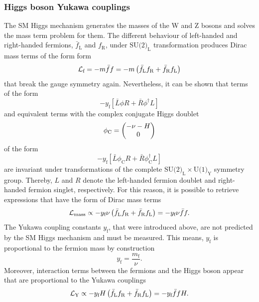 \subsubsection{Higgs boson Yukawa couplings}
The SM Higgs mechanism generates the masses of the W and Z bosons and solves the mass term problem for them. The 
different behaviour of left-handed and right-handed fermions, $\bar{f}_\text{L}$ and $f_\text{R}$,  under $\text{SU(2)}_\text{L}$ transformation produces Dirac mass terms of the form 
form
\begin{equation}
    \mathcal{L}_\text{f} = -m\bar{f}f  = -m \left( \bar{f}_\text{L}f_\text{R} + \bar{f}_\text{R}f_\text{L}\right)
\end{equation} 
that break the gauge symmetry again.
Nevertheless, it can be shown that terms of the form 
\begin{equation}
    -y_\text{f} \left[ \bar{L}\phi R + \bar{R}\phi^\dagger L \right]
\end{equation}
and equivalent terms with the complex conjugate Higgs doublet
\begin{equation}
     \phi_\text{C} = \begin{pmatrix} -\nu-H \\ 0 \end{pmatrix}
\end{equation}
of the form
\begin{equation}
    -y_\text{f} \left[ \bar{L}\phi_\text{C} R + \bar{R}\phi_\text{C}^\dagger L \right]
\end{equation}
 are invariant under transformations of the complete $\text{SU(2)}_\text{L} \times \text{U(1)}_\text{Y}$ symmetry group. 
Thereby, $L$ and $R$ denote the left-handed fermion doublet and right-handed fermion singlet, respectively.
For this reason, it is possible to retrieve expressions that have the form of Dirac mass terms 
\begin{equation}
    \mathcal{L}_{\text{mass}} \propto -y_\text{f} \nu \left( \bar{f}_\text{L} f_\text{R} + \bar{f}_\text{R} f_\text{L} \right) = -y_\text{f} \nu  \bar{f}f.
\end{equation} 
The Yukawa coupling constants $y_\text{f}$, that were introduced above, are not predicted by the SM Higgs mechanism and must be measured. 
This means, $y_\text{f}$ is proportional to the fermion mass by construction
\begin{equation}
    y_\text{f} = \frac{m_\text{f}}{\nu}.
\end{equation}
Moreover, interaction terms between the fermions and the Higgs boson appear that are proportional to the Yukawa couplings
\begin{equation}
    \mathcal{L}_\text{Y} \propto  -y_\text{f} H \left( \bar{f}_\text{L} f_\text{R} + \bar{f}_\text{R} f_\text{L} \right) = -y_\text{f} \bar{f}fH.
\end{equation} 

